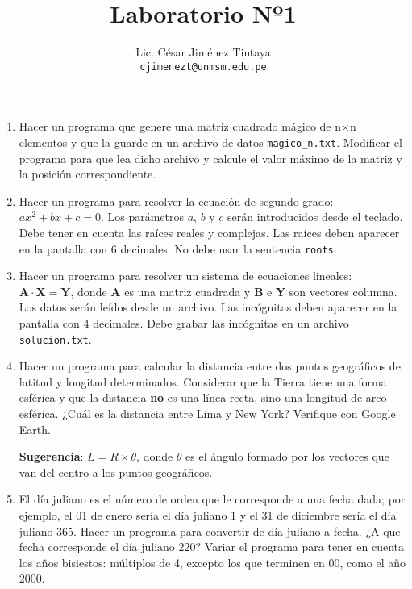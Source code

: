 \documentclass[a4paper,11pt,final]{article}
\begin{document}
    \title{Laboratorio Nº1}
    \author{Lic. César Jiménez Tintaya\\ \small{\texttt{cjimenezt@unmsm.edu.pe}}}
    \date{}
    \maketitle

    \begin{enumerate}
        \item Hacer un programa que genere una matriz cuadrado mágico de n×n elementos
        y que la guarde en un archivo de datos \texttt{magico\_n.txt}. Modificar el
        programa para que lea dicho archivo y calcule el valor máximo de la matriz
        y la posición correspondiente.

        \item Hacer un programa para resolver la ecuación de segundo grado:
        $ax^2+bx+c=0$. Los parámetros $a$, $b$ y $c$ serán introducidos desde
        el teclado. Debe tener en cuenta las raíces reales y complejas. Las
        raíces deben aparecer en la pantalla con 6 decimales. No debe usar la
        sentencia \texttt{roots}.

        \item Hacer un programa para resolver un sistema de ecuaciones
        lineales: $\mathbf{A}\cdot\mathbf{X}=\mathbf{Y}$, donde $\mathbf{A}$ es
        una matriz cuadrada y $\mathbf{B}$ e $\mathbf{Y}$ son vectores columna.
        Los datos serán leídos desde un archivo. Las incógnitas deben aparecer
        en la pantalla con 4 decimales. Debe grabar las incógnitas en un
        archivo \texttt{solucion.txt}.

        \item Hacer un programa para calcular la distancia entre dos puntos
        geográficos de latitud y longitud determinados. Considerar que la
        Tierra tiene una forma esférica y que la distancia \textbf{no} es una
        línea recta, sino una longitud de arco esférica. ¿Cuál es la distancia
        entre Lima y New York? Verifique con Google Earth.

        \textbf{Sugerencia}: $L=R\times\theta$, donde $\theta$ es el ángulo
        formado por los vectores que van del centro a los puntos geográficos.

        \item El día juliano es el número de orden que le corresponde a una
        fecha dada; por ejemplo, el 01 de enero sería el día juliano 1 y el 31
        de diciembre sería el día juliano 365. Hacer un programa para
        convertir de día juliano a fecha. ¿A que fecha corresponde el día
        juliano 220? Variar el programa para tener en cuenta los años
        bisiestos: múltiplos de 4, excepto los que terminen en 00, como el
        año 2000.


\end{enumerate}
\end{document}
